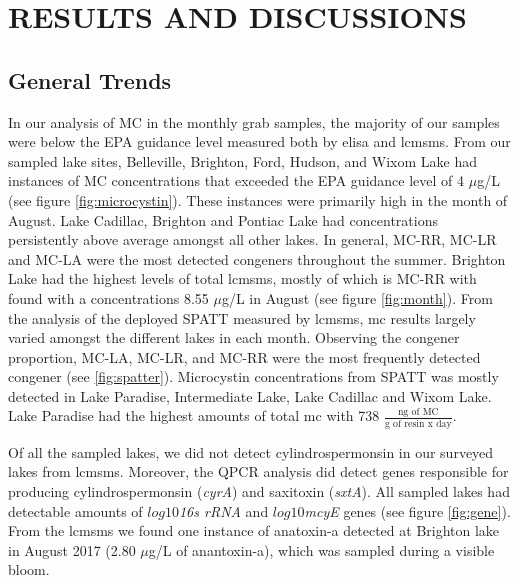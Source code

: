 \chapter{RESULTS AND DISCUSSIONS}
\section{General Trends}

In our analysis of MC in the monthly grab samples, the majority of our samples were below the EPA guidance level measured both by \gls{elisa} and \gls{lcmsms}. From our sampled lake sites, Belleville, Brighton, Ford, Hudson, and Wixom Lake had instances of MC concentrations that exceeded the EPA guidance level of 4 $\mu$g/L  (see figure \ref{fig:microcystin}). These instances were primarily high in the month of August. Lake Cadillac, Brighton and Pontiac Lake had concentrations persistently above average amongst all other lakes. In general, MC-RR, MC-LR and MC-LA were the most detected congeners throughout the summer. Brighton Lake had the highest levels of total \gls{lcmsms}, mostly of which is MC-RR with found with a concentrations 8.55 $\mu$g/L in August (see figure \ref{fig:month}). From the analysis of the deployed SPATT measured by \gls{lcmsms}, \gls{mc} results largely varied amongst the different lakes in each month. Observing the congener proportion, MC-LA, MC-LR, and MC-RR were the most frequently detected congener (see \ref{fig:spatter}). Microcystin concentrations from SPATT was mostly detected in Lake Paradise, Intermediate Lake, Lake Cadillac and Wixom Lake. Lake Paradise had the highest amounts of total \gls{mc} with 738 $\frac{\text{ng of MC}}{\text{g of resin x day}}$.  

Of all the sampled lakes, we did not detect cylindrospermonsin in our surveyed lakes from \gls{lcmsms}. Moreover, the QPCR analysis did detect genes responsible for producing cylindrospermonsin (\emph{cyrA}) and saxitoxin (\emph{sxtA}). All sampled lakes had detectable amounts of $log10$\emph{16s rRNA} and $log10$\emph{mcyE} genes (see figure \ref{fig:gene}).  From the \gls{lcmsms} we found one instance of anatoxin-a detected at Brighton lake in August 2017 (2.80 $\mu$g/L of anantoxin-a), which was sampled during a visible bloom. %


